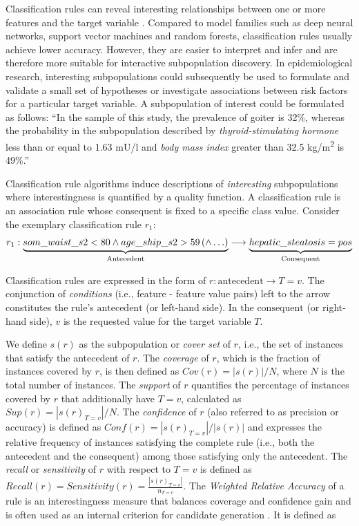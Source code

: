 \documentclass[
  oneside]{book}
\begin{document}
Classification rules can reveal interesting relationships between one or more features and the target variable \autocite{Fuernkranz:12,Herrera11}.
Compared to model families such as deep neural networks, support vector machines and random forests, classification rules usually achieve lower accuracy.
However, they are easier to interpret and infer and are therefore more suitable for interactive subpopulation discovery.
In epidemiological research, interesting subpopulations could subsequently be used to formulate and validate a small set of hypotheses or investigate associations between risk factors for a particular target variable.
A subpopulation of interest could be formulated as follows: ``In the sample of this study, the prevalence of goiter is 32\%, whereas the probability in the subpopulation described by \emph{thyroid-stimulating hormone} less than or equal to 1.63 mU/l and \emph{body mass index} greater than 32.5 kg/m\textsuperscript{2} is 49\%.''

Classification rule algorithms induce descriptions of \emph{interesting} subpopulations where interestingness is quantified by a quality function.
A classification rule is an association rule whose consequent is fixed to a specific class value.
Consider the exemplary classification rule \(r_1\):
\begin{equation}
r_1: \underbrace{som\_waist\_s2 < 80 \wedge age\_ship\_s2 > 59 \left(\wedge \ldots \right)}_{\text{Antecedent}} \longrightarrow \underbrace{\vphantom{som\_waist\_s2 < 80 \wedge age\_ship\_s2 > 59 \left(\wedge \ldots \right)}hepatic\_steatosis = pos}_{\text{Consequent}}
\label{eq:03-rule}
\end{equation}

Classification rules are expressed in the form of \(r: \text{antecedent} \longrightarrow T=v\).
The conjunction of \emph{conditions} (i.e., feature - feature value pairs) left to the arrow constitutes the rule's \(\text{antecedent}\) (or left-hand side).
In the \(\text{consequent}\) (or right-hand side), \(v\) is the requested value for the target variable \(T\).

We define \(s(r)\) as the subpopulation or \emph{cover set} of \(r\), i.e., the set of instances that satisfy the antecedent of \(r\).
The \emph{coverage} of \(r\), which is the fraction of instances covered by \(r\), is then defined as \(Cov(r)=|s(r)|/N\), where \(N\) is the total number of instances.
The \emph{support} of \(r\) quantifies the percentage of instances covered by \(r\) that additionally have \(T=v\), calculated as \(Sup(r)=|s(r)_{T=v}|/N\).
The \emph{confidence} of \(r\) (also referred to as precision or accuracy) is defined as \(Conf(r)= |s(r)_{T=v}|/|s(r)|\) and expresses the relative frequency of instances satisfying the complete rule (i.e., both the antecedent and the consequent) among those satisfying only the antecedent.
The \emph{recall} or \emph{sensitivity} of \(r\) with respect to \(T=v\) is defined as \(Recall(r)=Sensitivity(r)=\frac{|s(r)_{T=v}|}{n_{T=v}}\).
The \emph{Weighted Relative Accuracy} of a rule is an interestingness measure that balances coverage and confidence gain and is often used as an internal criterion for candidate generation \autocite{Herrera11}.
It is defined as
\end{document}
